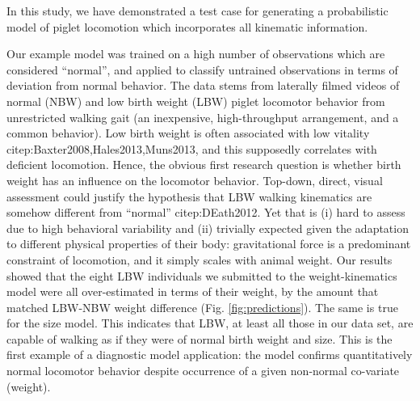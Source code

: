 \documentclass[10pt,a4paper]{article}
\begin{document}
\bigskip
In this study, we have demonstrated a test case for generating a probabilistic model of piglet locomotion which incorporates all kinematic information.

Our example model was trained on a high number of observations which are considered ``normal'', and applied to classify untrained observations in terms of deviation from normal behavior.
The data stems from laterally filmed videos of normal (NBW) and low birth weight (LBW) piglet locomotor behavior from unrestricted walking gait (an inexpensive, high-throughput arrangement, and a common behavior).
Low birth weight is often associated with low vitality citep:Baxter2008,Hales2013,Muns2013, and this supposedly correlates with deficient locomotion.
Hence, the obvious first research question is whether birth weight has an influence on the locomotor behavior.
Top-down, direct, visual assessment could justify the hypothesis that LBW walking kinematics are somehow different from ``normal'' citep:DEath2012.
Yet that is (i) hard to assess due to high behavioral variability and (ii) trivially expected given the adaptation to different physical properties of their body: gravitational force is a predominant constraint of locomotion, and it simply scales with animal weight.
Our results showed that the eight LBW individuals we submitted to the weight-kinematics model were all over-estimated in terms of their weight, by the amount that matched LBW-NBW weight difference (Fig. \ref{fig:predictions}).
The same is true for the size model.
This indicates that LBW, at least all those in our data set, are capable of walking as if they were of normal birth weight and size.
This is the first example of a diagnostic model application: the model confirms quantitatively normal locomotor behavior despite occurrence of a given non-normal co-variate (weight).
\end{document}
